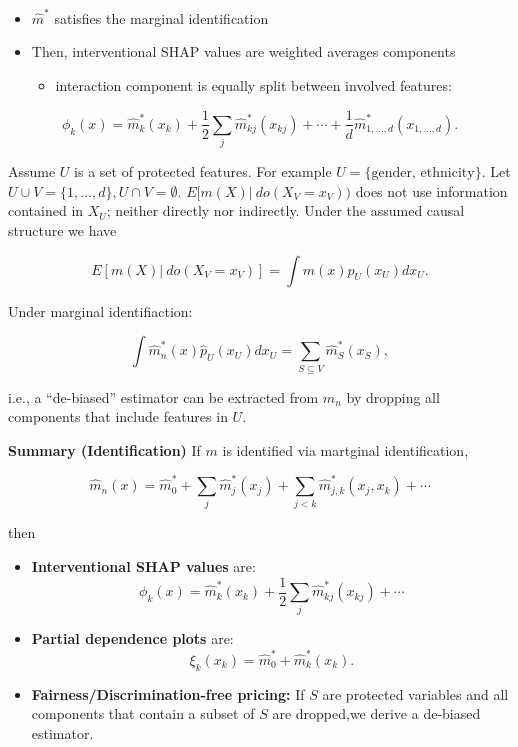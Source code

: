 \documentclass[
]{book}
\providecommand{\tightlist}{%
  \setlength{\itemsep}{0pt}\setlength{\parskip}{0pt}}
\begin{document}
\begin{itemize}
\tightlist
\item
  \(\hat m^{\ast}\) satisfies the marginal identification
\item
  Then, interventional SHAP values are weighted averages components

  \begin{itemize}
  \tightlist
  \item
    interaction component is equally split between involved features:
  \end{itemize}
\end{itemize}

\[
\phi_k(x)= \hat m^{\ast}_k(x_k)+ \frac 1 2 \sum_j  \hat m^{\ast}_{kj}(x_{kj}) + \cdots + \frac 1 d \hat m^{\ast}_{1,\dots,d}(x_{1,\dots,d}).
\]

Assume \(U\) is a set of protected features. For example \(U=\{\text{gender, ethnicity}\}\). Let \(U \cup V=\{1,\dots, d\}, U\cap V=\emptyset\). \(E[m(X) |\  do(X_V=x_V))\) does not use information contained in \(X_U\); neither directly nor indirectly. Under the assumed causal structure we have

\[
E[m(X) |\ do(X_V=x_V)]= \int m(x) p_U(x_U) dx_U.
\]

Under marginal identifiaction:

\[
\int \hat m_n^\ast(x) \hat p_U(x_U) dx_U= \sum_{S \subseteq V} \hat {m}^\ast_S(x_S),
\]

i.e., a ``de-biased'' estimator can be extracted from \(\hat m_n\) by dropping all components that include features in \(U\).

\textbf{Summary (Identification)} If \(m\) is identified via martginal identification,

\[
\hat m_n(x)=\hat m_0^\ast + \sum_j \hat m_j ^\ast (x_j) + \sum_{j<k} \hat m_{j,k} ^\ast (x_j,x_k)+ \cdots
\]

then

\begin{itemize}
\tightlist
\item
  \textbf{Interventional SHAP values} are:
  \[
    \phi_k(x)= \hat m^{\ast}_k(x_k)+ \frac 1 2 \sum_j  \hat m^{\ast}_{kj}(x_{kj}) + \cdots 
    \]
\item
  \textbf{Partial dependence plots} are:
  \[
    \xi_k(x_k)= \hat m_0^{\ast} + \hat m_k^\ast(x_k).
    \]
\item
  \textbf{Fairness/Discrimination-free pricing:} If \(S\) are protected variables and all components that contain a subset of \(S\) are dropped,we derive a de-biased estimator.
\end{itemize}
\end{document}
